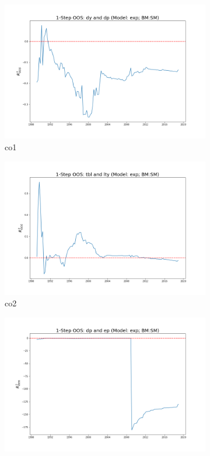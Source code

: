 \documentclass[a4paper,12pt,times,numbered,print,index]{report}
\numberwithin{equation}{section}
\begin{document}
	\begin{figure}[!htbp]
		\centering
		\caption{OOS Results for Model with $f_6$}
		\begin{subfigure}[b]{0.42\linewidth}
			\includegraphics[width=0.9\linewidth]{OOS_plots/exp_co1_SM.png}
			\caption{co1}
		\end{subfigure}
		\begin{subfigure}[b]{0.42\linewidth}
			\includegraphics[width=0.9\linewidth]{OOS_plots/exp_co2_SM.png}
			\caption{co2}
		\end{subfigure}
		\begin{subfigure}[b]{0.42\linewidth}
			\includegraphics[width=0.9\linewidth]{OOS_plots/exp_co3_SM.png}

\end{subfigure}
\end{figure}
\end{document}
